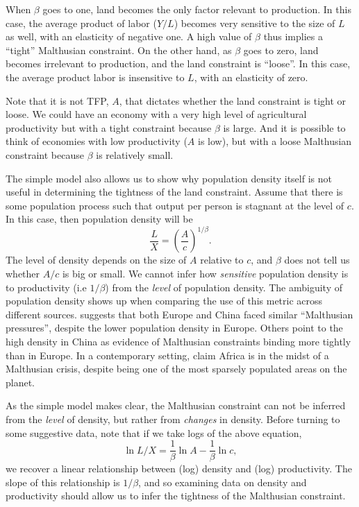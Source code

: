 \documentclass[11pt]{article}
\begin{document}
When $\beta$ goes to one, land becomes the only factor relevant to production. In this case, the average product of labor ($Y/L$) becomes very sensitive to the size of $L$ as well, with an elasticity of negative one. A high value of $\beta$ thus implies a ``tight'' Malthusian constraint. On the other hand, as $\beta$ goes to zero, land becomes irrelevant to production, and the land constraint is ``loose''. In this case, the average product labor is insensitive to $L$, with an elasticity of zero.

Note that it is not TFP, $A$, that dictates whether the land constraint is tight or loose. We could have an economy with a very high level of agricultural productivity but with a tight constraint because $\beta$ is large. And it is possible to think of economies with low productivity ($A$ is low), but with a loose Malthusian constraint because $\beta$ is relatively small.

The simple model also allows us to show why population density itself is not useful in determining the tightness of the land constraint. Assume that there is some population process such that output per person is stagnant at the level of $c$. In this case, then population density will be
\begin{equation}
    \frac{L}{X} = \left(\frac{A}{c}\right)^{1/\beta}.
\end{equation}
The level of density depends on the size of $A$ relative to $c$, and $\beta$ does not tell us whether $A/c$ is big or small. We cannot infer how \textit{sensitive} population density is to productivity (i.e $1/\beta$) from the \textit{level} of population density. The ambiguity of population density shows up when comparing the use of this metric across different sources. \citet{pom2000} suggests that both Europe and China faced similar ``Malthusian pressures'', despite the lower population density in Europe. Others \citep{Elvin1973,huang2002} point to the high density in China as evidence of Malthusian constraints binding more tightly than in Europe. In a contemporary setting, \citet{conleyetal2007} claim Africa is in the midst of a Malthusian crisis, despite being one of the most sparsely populated areas on the planet. 

As the simple model makes clear, the Malthusian constraint can not be inferred from the \textit{level} of density, but rather from \textit{changes} in density. Before turning to some suggestive data, note that if we take logs of the above equation,
\begin{equation}
	\ln L/X = \frac{1}{\beta} \ln A - \frac{1}{\beta} \ln c, \label{EQ_LX}
\end{equation}
we recover a linear relationship between (log) density and (log) productivity. The slope of this relationship is $1/\beta$, and so examining data on density and productivity should allow us to infer the tightness of the Malthusian constraint.
\end{document}
